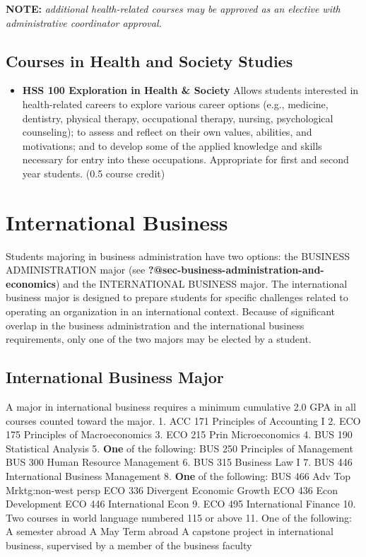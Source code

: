 \documentclass[
  letterpaper,
]{scrbook}
\providecommand{\tightlist}{%
  \setlength{\itemsep}{0pt}\setlength{\parskip}{0pt}}
\begin{document}
\textbf{NOTE:} \emph{additional health-related courses may be approved
as an elective with administrative coordinator approval.}

\subsection{Courses in Health and Society
Studies}\label{courses-in-health-and-society-studies-1}

\begin{itemize}
\tightlist
\item
  \textbf{HSS 100 Exploration in Health \& Society} Allows students
  interested in health-related careers to explore various career options
  (e.g., medicine, dentistry, physical therapy, occupational therapy,
  nursing, psychological counseling); to assess and reflect on their own
  values, abilities, and motivations; and to develop some of the applied
  knowledge and skills necessary for entry into these occupations.
  Appropriate for first and second year students. (0.5 course credit)
\end{itemize}

\section{International Business}\label{sec-international-business}

Students majoring in business administration have two options: the
BUSINESS ADMINISTRATION major (see
\textbf{?@sec-business-administration-and-economics}) and the
INTERNATIONAL BUSINESS major. The international business major is
designed to prepare students for specific challenges related to
operating an organization in an international context. Because of
significant overlap in the business administration and the international
business requirements, only one of the two majors may be elected by a
student.

\subsection{International Business
Major}\label{international-business-major}

A major in international business requires a minimum cumulative 2.0 GPA
in all courses counted toward the major. 1. ACC 171 Principles of
Accounting I 2. ECO 175 Principles of Macroeconomics 3. ECO 215 Prin
Microeconomics 4. BUS 190 Statistical Analysis 5. \textbf{One} of the
following: BUS 250 Principles of Management BUS 300 Human Resource
Management 6. BUS 315 Business Law I 7. BUS 446 International Business
Management 8. \textbf{One} of the following: BUS 466 Adv Top
Mrktg:non-west persp ECO 336 Divergent Economic Growth ECO 436 Econ
Development ECO 446 International Econ 9. ECO 495 International Finance
10. Two courses in world language numbered 115 or above 11. One of the
following: A semester abroad A May Term abroad A capstone project in
international business, supervised by a member of the business faculty
\end{document}
